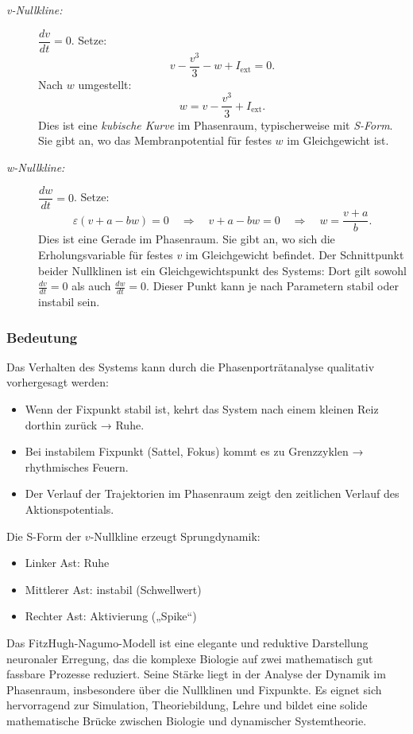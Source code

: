 \begin{description}
\item[\emph{v-Nullkline:}] $\dfrac{dv}{dt} = 0$.
Setze:
\[
v - \frac{v^3}{3} - w + I_{\text{ext}} = 0.
\]
Nach $w$ umgestellt:
\[
w = v - \frac{v^3}{3} + I_{\text{ext}}.
\]
Dies ist eine \emph{kubische Kurve} im Phasenraum, typischerweise mit \emph{S-Form}.  
%
Sie gibt an, wo das Membranpotential für festes $w$ im Gleichgewicht ist.

\item[\emph{w-Nullkline:}] $\dfrac{dw}{dt} = 0$.
Setze:
\[
\varepsilon (v + a - b w) = 0
\quad\Rightarrow\quad
v + a - b w = 0
\quad\Rightarrow\quad
w = \frac{v + a}{b}.
\]
Dies ist eine Gerade im Phasenraum.  
%
Sie gibt an, wo sich die Erholungsvariable für festes $v$ im
Gleichgewicht befindet.
Der Schnittpunkt beider Nullklinen ist ein Gleichgewichtspunkt des
%
Systems: Dort gilt sowohl $\frac{dv}{dt} = 0$ als
auch $\frac{dw}{dt} = 0$.
Dieser Punkt kann je nach Parametern stabil oder instabil sein.
\end{description}

\subsubsection{Bedeutung}
Das Verhalten des Systems kann durch die Phasenporträtanalyse qualitativ vorhergesagt werden:
\begin{itemize}
	\item Wenn der Fixpunkt stabil ist, kehrt das System nach einem kleinen Reiz dorthin zurück → Ruhe.
	\item Bei instabilem Fixpunkt (Sattel, Fokus) kommt es zu Grenzzyklen → rhythmisches Feuern.
	\item Der Verlauf der Trajektorien im Phasenraum zeigt den zeitlichen Verlauf des Aktionspotentials.
\end{itemize}
Die S-Form der $v$-Nullkline erzeugt Sprungdynamik:
\begin{itemize}
	\item Linker Ast: Ruhe
	\item Mittlerer Ast: instabil (Schwellwert)
	\item Rechter Ast: Aktivierung („Spike“)
\end{itemize}
Das FitzHugh-Nagumo-Modell ist eine elegante und reduktive Darstellung neuronaler Erregung, das die komplexe Biologie auf zwei mathematisch gut fassbare Prozesse reduziert. Seine Stärke liegt in der Analyse der Dynamik im Phasenraum, insbesondere über die Nullklinen und Fixpunkte. Es eignet sich hervorragend zur Simulation, Theoriebildung, Lehre und bildet eine solide mathematische Brücke zwischen Biologie und dynamischer Systemtheorie.

